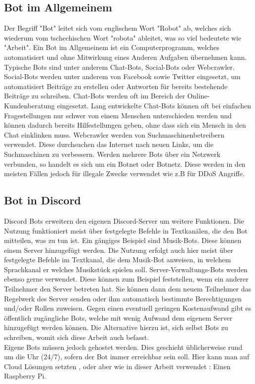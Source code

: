 \documentclass[sigplan,screen]{acmart}
\begin{document}
\subsection{Bot im Allgemeinem}
Der Begriff "Bot" leitet sich vom englischem Wort "Robot" ab, welches sich wiederum vom tschechischen Wort "robota" ableitet, was so viel bedeutete wie "Arbeit". \cite{bot1} Ein Bot im Allgemeinem ist ein Computerprogramm, welches automatisiert und ohne Mitwirkung eines Anderen Aufgaben übernehmen kann. Typische Bots sind unter anderem Chat-Bots, Social-Bots oder Webcrawler. \\
\noindent Social-Bots werden unter anderem von Facebook sowie Twitter eingesetzt, um automatisiert Beiträge zu erstellen oder Antworten für bereits bestehende Beiträge zu schreiben.\cite{bot2} Chat-Bots werden oft im Bereich der Online- Kundenberatung eingesetzt. Lang entwickelte Chat-Bots können oft bei einfachen Fragestellungen nur schwer von einem Menschen unterschieden werden und können dadurch bereits Hilfestellungen geben, ohne dass sich ein Mensch in den Chat einklinken muss. \cite{chatbot} Webcrawler werden von Suchmaschinenbetreibern verwendet. Diese durchsuchen das Internet nach neuen Links, um die Suchmaschinen zu verbessern. Werden mehrere Bots über ein Netzwerk verbunden, so handelt es sich um ein Botnet oder Botnetz. Diese werden in den meisten Fällen jedoch für illegale Zwecke verwendet wie z.B für DDoS Angriffe. \cite{bot2}

\subsection{Bot in Discord}
Discord Bots erweitern den eigenen Discord-Server um weitere Funktionen. Die
Nutzung funktioniert meist über festgelegte Befehle in Textkanälen, die den Bot mitteilen, was zu tun ist. Ein gängiges Beispiel sind Musik-Bots. Diese können einem Server hinzugefügt werden. Die
Nutzung erfolgt auch hier meist über festgelegte Befehle im Textkanal, die dem Musik-Bot anweisen,
in welchem Sprachkanal er welches Musikstück spielen soll.
Server-Verwaltungs-Bots werden ebenso gerne verwendet. Diese können zum Beispiel
feststellen, wenn ein anderer Teilnehmer den Server betreten hat. Sie können dann dem
neuem Teilnehmer das Regelwerk des Server senden oder ihm automatisch bestimmte
Berechtigungen und/oder Rollen zuweisen. \cite{pcdoc1}
Gegen einen eventuell geringen Kostenaufwand gibt es öffentlich zugängliche Bots, welche mit wenig Aufwand dem eigenem Server hinzugefügt werden können.\cite{discoliste}
Die Alternative hierzu ist, sich selbst Bots zu schreiben, womit sich diese Arbeit auch
befasst. \\
\noindent Eigene Bots müssen jedoch gehostet werden. Dies geschieht üblicherweise rund
um die Uhr (24/7), sofern der Bot immer erreichbar sein soll.
Hier kann man auf Cloud Lösungen setzten \cite{cloud}, oder aber wie in dieser Arbeit verwendet : Einen Raspberry Pi.\cite{rapho}
\end{document}
